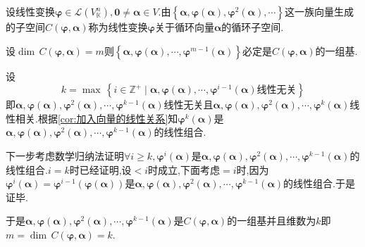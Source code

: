 \begin{formal}
\begin{definition}[一般的循环子空间定义]\label{def:一般的循环子空间定义}
    设线性变换$\bm{\varphi}\in\mathcal{L}\left(
        V_{\mathbb{K}}^n
    \right),\bm{0}\neq\bm{\alpha}\in V$.由$\left\{
        \bm{\alpha},\bm{\varphi}\left(\bm{\alpha}\right),\bm{\varphi}^2\left(\bm{\alpha}\right),\cdots
    \right\}$这一族向量生成的子空间$C\left(
        \bm{\varphi},\bm{\alpha}
    \right)$称为线性变换$\bm{\varphi}$关于循环向量$\bm{\alpha}$的循环子空间.
\end{definition}
\end{formal}
\begin{green}
\begin{lemma}[循环子空间的基]\label{lemma:循环子空间的基}
    设$\dim\,C\left(\bm{\varphi},\bm{\alpha}\right)=m$则$\left\{
        \bm{\alpha},\bm{\varphi}\left(\bm{\alpha}\right),\cdots,\bm{\varphi}^{m-1}\left(\bm{\alpha}\right)
    \right\}$必定是$C\left(\bm{\varphi},\bm{\alpha}\right)$的一组基.
\end{lemma}\begin{Proof}
    设\[k=\max\,\left\{
        i\in\mathbb{Z}^+\mid \bm{\alpha},\bm{\varphi}\left(\bm{\alpha}\right),\cdots,\bm{\varphi}^{i-1}\left(\bm{\alpha}\right)\text{线性无关}
    \right\}\]即$\bm{\alpha},\bm{\varphi}\left(\bm{\alpha}\right),\bm{\varphi}^2\left(\bm{\alpha}\right),\cdots,\bm{\varphi}^{k-1}\left(\bm{\alpha}\right)$线性无关且$\bm{\alpha},\bm{\varphi}\left(\bm{\alpha}\right),\bm{\varphi}^2\left(\bm{\alpha}\right),\cdots,\bm{\varphi}^{k}\left(\bm{\alpha}\right)$线性相关.根据\cref{cor:加入向量的线性关系}知$\bm{\varphi}^k\left(\bm{\alpha}\right)$是$\bm{\alpha},\bm{\varphi}\left(\bm{\alpha}\right),\bm{\varphi}^2\left(\bm{\alpha}\right),\cdots,\bm{\varphi}^{k-1}\left(\bm{\alpha}\right)$的线性组合.

    下一步考虑数学归纳法证明$\forall i\geqslant k,\bm{\varphi}^i\left(\bm{\alpha}\right)$是$\bm{\alpha},\bm{\varphi}\left(\bm{\alpha}\right),\bm{\varphi}^2\left(\bm{\alpha}\right),\cdots,\bm{\varphi}^{k-1}\left(\bm{\alpha}\right)$的线性组合.$i=k$时已经证明,设$<i$时成立,下面考虑$=i$时,因为$\bm{\varphi}^{i}\left(\bm{\alpha}\right)=\bm{\varphi}^{i-1}\left(\bm{\varphi}\left(\bm{\alpha}\right)\right)$是$\bm{\alpha},\bm{\varphi}\left(\bm{\alpha}\right),\bm{\varphi}^2\left(\bm{\alpha}\right),\cdots,\bm{\varphi}^{k-1}\left(\bm{\alpha}\right)$的线性组合.于是证毕.

    于是$\bm{\alpha},\bm{\varphi}\left(\bm{\alpha}\right),\bm{\varphi}^2\left(\bm{\alpha}\right),\cdots,\bm{\varphi}^{k-1}\left(\bm{\alpha}\right)$是$C\left(\bm{\varphi},\bm{\alpha}\right)$的一组基并且维数为$k$即$m=\dim\,C\left(\bm{\varphi},\bm{\alpha}\right)=k$.
\end{Proof}
\end{green}

